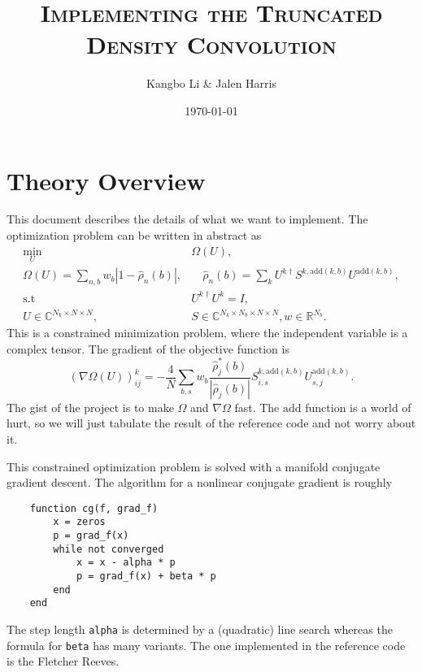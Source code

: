 \documentclass[a4paper, 12pt]{article}
\title{\scshape Implementing the Truncated Density Convolution}
\author{\normalsize Kangbo Li \& Jalen Harris}
\date{\normalsize \today}
\begin{document}
\maketitle

\section{Theory Overview}%
\label{sec:Theory Overview}

This document describes the details of what we want to implement. 
The optimization problem can be written in abstract as 
\begin{align}
        \min_{U}\; &  \Omega(U),\\
        \Omega(U) = \sum_{n, b} w_b |1 - \hat{\rho}_n(b)|,& \quad \hat{\rho}_n(b) = \sum_k U^{k \dagger} S^{k, \mathrm{add}(k, b)} U^{\mathrm{add}(k, b)},\\
        \mathrm{s.t}\; & U^{k \dagger} U^{k} = I,\\
        U \in \mathbb{C}^{N_k \times N \times N},& S \in \mathbb{C}^{N_k \times N_b \times N \times N}, 
        w \in \mathbb{R}^{N_b}\label{eq:dimensions}.
\end{align}
This is a constrained minimization problem, where the independent variable  is
a complex tensor. The gradient of the objective function is 
\begin{equation}
    (\nabla \Omega(U))^k_{ij} = - \frac{4}{N}  \sum_{b, s} w_b \frac{\hat{\rho}_j^*(b)}{|\hat{\rho}_j(b)|} S_{i, s}^{k, \mathrm{add}(k, b)} U_{s, j}^{\mathrm{add}(k, b)}.
\end{equation}
The gist of the project is to make $\Omega$ and $\nabla \Omega$ fast. The
$\mathrm{add}$ function is  a world of hurt, so we will just tabulate the
result of the reference code and not worry about it.

This constrained optimization problem is solved with a manifold conjugate
gradient descent. The algorithm for a nonlinear conjugate gradient is roughly
\vspace{-0.5cm}
\begin{verbatim}
    function cg(f, grad_f)
        x = zeros
        p = grad_f(x)
        while not converged
            x = x - alpha * p
            p = grad_f(x) + beta * p
        end
    end
\end{verbatim}
\vspace{-0.5cm}
The step length \texttt{alpha} is determined by a (quadratic) line search
whereas the formula for \texttt{beta} has many variants.  The one implemented
in the reference code is the Fletcher Reeves.
\end{document}
